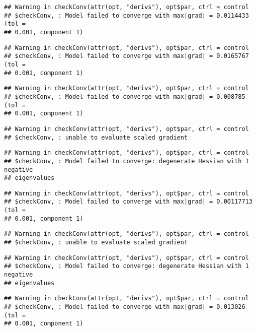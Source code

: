 \documentclass[]{article}
\begin{document}
\begin{verbatim}
## Warning in checkConv(attr(opt, "derivs"), opt$par, ctrl = control
## $checkConv, : Model failed to converge with max|grad| = 0.0114433 (tol =
## 0.001, component 1)
\end{verbatim}

\begin{verbatim}
## Warning in checkConv(attr(opt, "derivs"), opt$par, ctrl = control
## $checkConv, : Model failed to converge with max|grad| = 0.0165767 (tol =
## 0.001, component 1)
\end{verbatim}

\begin{verbatim}
## Warning in checkConv(attr(opt, "derivs"), opt$par, ctrl = control
## $checkConv, : Model failed to converge with max|grad| = 0.008785 (tol =
## 0.001, component 1)
\end{verbatim}

\begin{verbatim}
## Warning in checkConv(attr(opt, "derivs"), opt$par, ctrl = control
## $checkConv, : unable to evaluate scaled gradient
\end{verbatim}

\begin{verbatim}
## Warning in checkConv(attr(opt, "derivs"), opt$par, ctrl = control
## $checkConv, : Model failed to converge: degenerate Hessian with 1 negative
## eigenvalues
\end{verbatim}

\begin{verbatim}
## Warning in checkConv(attr(opt, "derivs"), opt$par, ctrl = control
## $checkConv, : Model failed to converge with max|grad| = 0.00117713 (tol =
## 0.001, component 1)
\end{verbatim}

\begin{verbatim}
## Warning in checkConv(attr(opt, "derivs"), opt$par, ctrl = control
## $checkConv, : unable to evaluate scaled gradient
\end{verbatim}

\begin{verbatim}
## Warning in checkConv(attr(opt, "derivs"), opt$par, ctrl = control
## $checkConv, : Model failed to converge: degenerate Hessian with 1 negative
## eigenvalues
\end{verbatim}

\begin{verbatim}
## Warning in checkConv(attr(opt, "derivs"), opt$par, ctrl = control
## $checkConv, : Model failed to converge with max|grad| = 0.013026 (tol =
## 0.001, component 1)
\end{verbatim}
\end{document}
